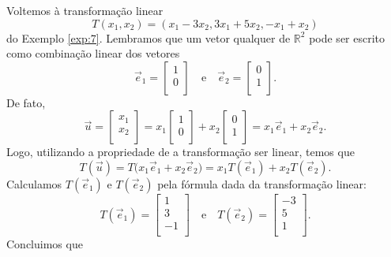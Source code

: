 \documentclass[../livro.tex]{subfiles}
\begin{document}
Voltemos à transformação linear
\begin{equation}
T(x_1, x_2) = (x_1 - 3 x_2, 3x_1 + 5x_2, -x_1 + x_2)
\end{equation} do Exemplo \ref{exp:7}. Lembramos que um vetor qualquer de $\mathbb{R}^2$ pode ser escrito como combinação linear dos vetores
\begin{equation}
\vec{e}_1 =
\left[
  \begin{array}{r}
    1 \\
    0 \\
  \end{array}
\right]\quad \text{e}\quad
\vec{e}_2 =
\left[
  \begin{array}{c}
    0\\
    1\\
  \end{array}
\right].
\end{equation} De fato,
\begin{equation}
\vec{u} =
\left[
  \begin{array}{r}
    x_1 \\
    x_2 \\
  \end{array}
\right] =
x_1 \left[
  \begin{array}{r}
    1 \\
    0 \\
  \end{array}
\right] +
x_2 \left[
  \begin{array}{c}
    0\\
    1\\
  \end{array}
\right] = x_1 \vec{e}_1 + x_2 \vec{e}_2.
\end{equation} Logo, utilizando a propriedade de a transformação ser linear, temos que
\begin{equation}
T( \vec{u} ) = T\big( x_1 \vec{e}_1 + x_2 \vec{e}_2 \big) = x_1 T(\vec{e}_1) + x_2 T(\vec{e}_2).
\end{equation} Calculamos $T(\vec{e}_1)$ e $T(\vec{e}_2)$ pela fórmula dada da transformação linear:
\begin{equation}
T(\vec{e}_1) =
\left[
  \begin{array}{r}
    1 \\
    3 \\
    -1 \\
  \end{array}
\right] \quad \text{e}\quad
T(\vec{e}_2) =
\left[
  \begin{array}{r}
    -3 \\
     5 \\
     1 \\
  \end{array}
\right].
\end{equation} Concluimos que
\end{document}
